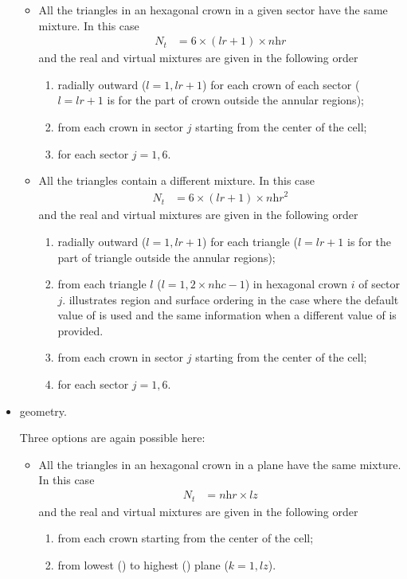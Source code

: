 \begin{itemize}
\begin{itemize}
\item All the triangles in an hexagonal crown in a given sector have the same mixture. In this case
\begin{align*}N_{t}&=6\times (\textit{lr}+1)\times \textit{nhr}\end{align*}
and the real and virtual mixtures are given in the following order 
\begin{enumerate}
\item radially outward ($l=1,\textit{lr}+1$) for each crown of each sector ($l=\textit{lr}+1$ is for the part of crown outside the annular regions);
\item from each crown in sector $j$ starting from the center of the cell;
\item for each sector $j=1,6$.
\end{enumerate}

\item All the triangles contain a different mixture. In this case
\begin{align*}N_{t}&=6\times (\textit{lr}+1)\times \textit{nhr}^{2}\end{align*}
and the real and virtual mixtures are given in the following order 
\begin{enumerate}
\item radially outward ($l=1,\textit{lr}+1$) for each triangle ($l=\textit{lr}+1$ is for the part of triangle outside the annular regions);
\item from each triangle $l$ ($l=1,2\times \textit{nhc}-1$) in hexagonal crown $i$ of sector $j$.  illustrates region and surface ordering in the case where the default value of  is used and  the same information when a different value of  is provided.
\item from each crown in sector $j$ starting from the center of the cell;
\item for each sector $j=1,6$.
\end{enumerate}
\end{itemize}

\item {} geometry.

Three options are again possible here:
\begin{itemize}
\item All the triangles in an hexagonal crown in a plane have the same mixture. In this case
\begin{align*}N_{t}&=\textit{nhr}\times  \textit{lz}\end{align*}
and the real and virtual mixtures are given in the following order
\begin{enumerate}
\item from each crown starting from the center of the cell;
\item from lowest () to highest () plane ($k=1,\textit{lz}$).
\end{enumerate}


\end{itemize}
\end{itemize}
